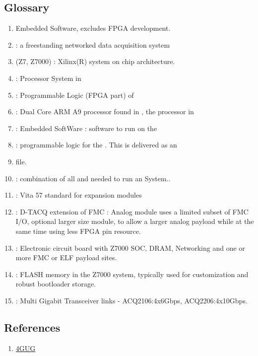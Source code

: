 \documentclass[]{article}
\begin{document}
\subsection{Glossary}
\begin{enumerate}
    \item {} Embedded Software, excludes FPGA development.
    \item {}: a freestanding networked data acquisition system
    \item {} (Z7, Z7000)  : Xilinx(R) system on chip architecture.
    \item {} : Processor System in 
    \item {} : Programmable Logic (FPGA part) of 
    \item {} : Dual Core ARM A9 processor found in  , the processor in 
    \item {} : Embedded SoftWare : software to run on the 
    \item {}: programmable logic for the . This is delivered as an 
    \item {} file.
    \item {}: combination of all  and  needed to run an  System..
    \item {}: Vita 57 standard for expansion modules
    \item {} : D-TACQ extension of FMC : Analog module uses a limited subset of FMC I/O, optional larger size module, to allow a larger analog payload while at the same time using less FPGA pin resource.
    \item {}: Electronic circuit board with Z7000 SOC, DRAM, Networking and one or more FMC or ELF payload sites.
    \item {}: FLASH memory in the Z7000 system, typically used for customization and robust bootloader storage.  
    \item {}: Multi Gigabit Transceiver links - ACQ2106:4x6Gbps, ACQ2206:4x10Gbps.
\end{enumerate}

\subsection{References}
\begin{enumerate}
    \item \href{https://github.com/seanalsop/bolodsp-doc/releases}{4GUG}
\end{enumerate} 
\end{document}
